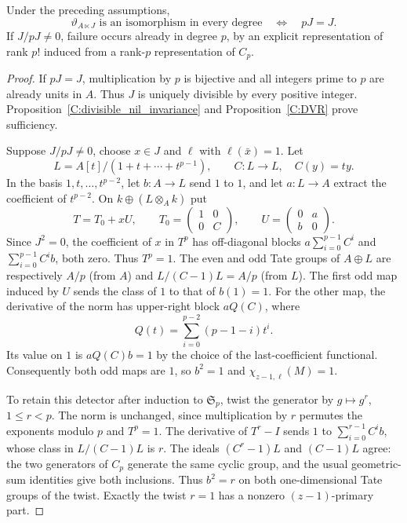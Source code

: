\begin{proposition}
\label{C:unramified_flat_squarezero_allprimes}
Under the preceding assumptions,
\[
 \vartheta_{A\ltimes J}\text{ is an isomorphism in every degree}
       \quad\Longleftrightarrow\quad pJ=J.
\]
If $J/pJ\ne0$, failure occurs already in degree $p$, by an explicit
representation of rank $p!$ induced from a rank-$p$ representation
of $C_p$.
\end{proposition}
\begin{proof}
If $pJ=J$, multiplication by $p$ is bijective and all integers prime
to $p$ are already units in $A$. Thus $J$ is uniquely divisible by
every positive integer. Proposition~\ref{C:divisible_nil_invariance}
and Proposition~\ref{C:DVR} prove sufficiency.

Suppose $J/pJ\ne0$, choose $x\in J$ and $\ell$ with $\ell(\bar x)=1$.
Let
\[
 L=A[t]/(1+t+\cdots+t^{p-1}),\qquad C:L\to L,
       \quad C(y)=ty.
\]
In the basis $1,t,\ldots,t^{p-2}$, let $b:A\to L$ send $1$ to $1$,
and let $a:L\to A$ extract the coefficient of $t^{p-2}$.
On $k\oplus(L\otimes_Ak)$ put
\[
 T=T_0+xU,\qquad
 T_0=\begin{pmatrix}1&0\\0&C\end{pmatrix},\qquad
 U=\begin{pmatrix}0&a\\b&0\end{pmatrix}.
\]
Since $J^2=0$, the coefficient of $x$ in $T^p$ has off-diagonal
blocks $a\sum_{i=0}^{p-1}C^i$ and
$\sum_{i=0}^{p-1}C^ib$, both zero. Thus $T^p=1$.
The even and odd Tate groups of $A\oplus L$ are respectively
$A/p$ (from $A$) and $L/(C-1)L=A/p$ (from $L$).
The first odd map induced by $U$ sends the class of $1$ to that of
$b(1)=1$.
For the other map, the derivative of the norm has upper-right block
$aQ(C)$, where
\[
 Q(t)=\sum_{i=0}^{p-2}(p-1-i)t^i.
\]
Its value on $1$ is $aQ(C)b=1$ by the choice of the last-coefficient
functional. Consequently both odd maps are $1$, so $b^2=1$ and
$\chi_{z-1,\ell}(M)=1$.

To retain this detector after induction to $\mathfrak S_p$, twist
the generator by $g\mapsto g^r$, $1\le r<p$.
The norm is unchanged, since multiplication by $r$ permutes the
exponents modulo $p$ and $T^p=1$. The derivative of $T^r-I$ sends
$1$ to $\sum_{i=0}^{r-1}C^ib$, whose class in
$L/(C-1)L$ is $r$. The ideals $(C^r-1)L$ and $(C-1)L$ agree:
the two generators of $C_p$ generate the same cyclic group, and
the usual geometric-sum identities give both inclusions.
Thus $b^2=r$ on both one-dimensional Tate groups of the twist.
Exactly the twist $r=1$ has a nonzero $(z-1)$-primary part.


\end{proof}
